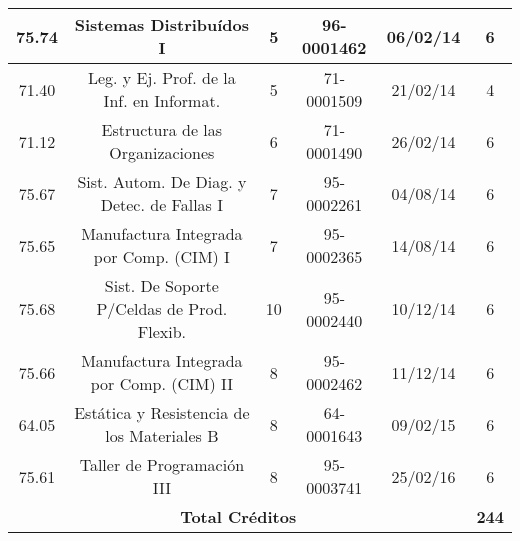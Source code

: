 {\begin{center}
\begin{tabular}{|c|c|c|c|c|c|}
            \hline 
            75.74 & Sistemas Distribuídos I                    & 5  & 96-0001462 & 06/02/14 & 6 \\
            \hline
            71.40 & Leg. y Ej. Prof. de la Inf. en Informat.   & 5  & 71-0001509 & 21/02/14 & 4 \\
            \hline
            71.12 & Estructura de las Organizaciones           & 6  & 71-0001490 & 26/02/14 & 6 \\
            \hline
            75.67 & Sist. Autom. De Diag. y Detec. de Fallas I & 7  & 95-0002261 & 04/08/14 & 6 \\
            \hline
            75.65 & Manufactura Integrada por Comp. (CIM) I    & 7  & 95-0002365 & 14/08/14 & 6 \\
            \hline
            75.68 & Sist. De Soporte P/Celdas de Prod. Flexib. & 10 & 95-0002440 & 10/12/14 & 6 \\
            \hline
            75.66 & Manufactura Integrada por Comp. (CIM) II   & 8  & 95-0002462 & 11/12/14 & 6 \\
            \hline
            64.05 & Estática y Resistencia de los Materiales B & 8  & 64-0001643 & 09/02/15 & 6 \\
            \hline
            75.61 & Taller de Programación III                 & 8  & 95-0003741 & 25/02/16 & 6 \\
            \hline
            \multicolumn{5}{|c|}{\textbf{Total Créditos}} & \textbf{244} \\
            \hline
        \end{tabular}
        \end{center}
    }

